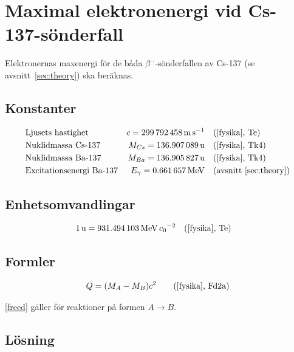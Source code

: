 \section{Maximal elektronenergi vid Cs-137-sönderfall} \label{sec:maxenergy}

Elektronernas maxenergi för de båda $\beta^-$-sönderfallen av Cs-137 (se
avsnitt~\ref{sec:theory}) ska beräknas.

\subsection*{Konstanter}

\begin{align*}
    & \text{Ljusets hastighet}        & c        = \qty{299792458}{\m\per\s}         &\quad \fysika{Te}     \\
    & \text{Nuklidmassa Cs-137}       & M_{Cs}   = \qty{136.907089}{\atomicmassunit} &\quad \fysika{Tk4}    \\
    & \text{Nuklidmassa Ba-137}       & M_{Ba}   = \qty{136.905827}{\atomicmassunit} &\quad \fysika{Tk4}    \\
    & \text{Excitationsenergi Ba-137} & E_\gamma = \qty{0.661657}{\MeV}              &\quad \text{(avsnitt~\ref{sec:theory})}
\end{align*}

\subsection*{Enhetsomvandlingar}

\begin{align*}
    & \qty{1}{\atomicmassunit} = \qty{931.494103}{\MeV\per\clight\squared} \quad \fysika{Te}
\end{align*}

\subsection*{Formler}

\begin{align}
    Q &= (M_A - M_B)c^2 &\quad \fysika{Fd2a} \label{freed}
\end{align}

\eqref{freed} gäller för reaktioner på formen $A \longrightarrow B$.

\subsection*{Lösning}

